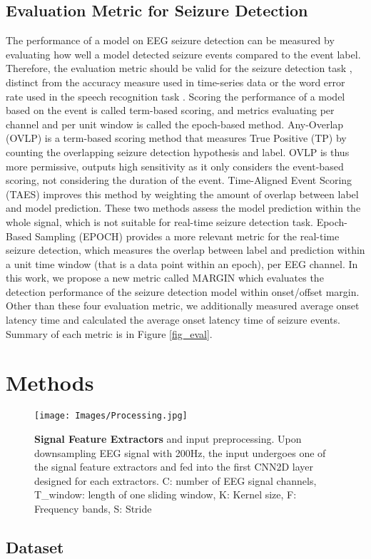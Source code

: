 \documentclass[pmlr,twocolumn,10pt]{jmlr}
\begin{document}
\subsection{Evaluation Metric for Seizure Detection}
The performance of a model on EEG seizure detection can be measured by evaluating how well a model detected seizure events compared to the event label. Therefore, the evaluation metric should be valid for the seizure detection task \citep{ziyabari2017objective}, distinct from the accuracy measure used in time-series data or the word error rate used in the speech recognition task \citep{wang2003word, mostefa2006evaluation}. Scoring the performance of a model based on the event is called term-based scoring, and metrics evaluating per channel and per unit window is called the epoch-based method. Any-Overlap (OVLP) \citep{wilson2003seizure, gotman1997automatic} is a term-based scoring method that measures True Positive (TP) by counting the overlapping seizure detection hypothesis and label. OVLP is thus more permissive, outputs high sensitivity as it only considers the event-based scoring, not considering the duration of the event. Time-Aligned Event Scoring (TAES) improves this method by weighting the amount of overlap between label and model prediction. These two methods assess the model prediction within the whole signal, which is not suitable for real-time seizure detection task. Epoch-Based Sampling (EPOCH) \citep{baldassano2016novel} provides a more relevant metric for the real-time seizure detection, which measures the overlap between label and prediction within a unit time window (that is a data point within an epoch), per EEG channel. In this work, we propose a new metric called MARGIN which evaluates the detection performance of the seizure detection model within onset/offset margin. Other than these four evaluation metric, we additionally measured average onset latency time and calculated the average onset latency time of seizure events. Summary of each metric is in Figure \ref{fig_eval}. \section{Methods}
\label{sec:methods}
\begin{figure*}[h!]
	\centering
	\texttt{[image: Images/Processing.jpg]}
    \caption{\small \textbf{Signal Feature Extractors} and input preprocessing. Upon downsampling EEG signal with 200Hz, the input undergoes one of the signal feature extractors and fed into the first CNN2D layer designed for each extractors. C: number of EEG signal channels, T\_window: length of one sliding window, K: Kernel size, F: Frequency bands, S: Stride}
	\label{preproc}
	\vspace{-5pt}
\end{figure*} \subsection{Dataset}
\end{document}
